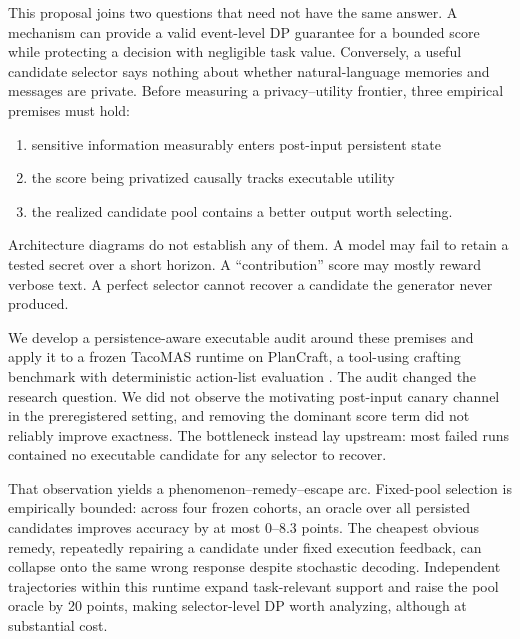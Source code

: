 \documentclass{article}
\begin{document}
This proposal joins two questions that need not have the same answer. A mechanism can provide a valid event-level DP guarantee for a bounded score while protecting a decision with negligible task value. Conversely, a useful candidate selector says nothing about whether natural-language memories and messages are private. Before measuring a privacy--utility frontier, three empirical premises must hold:
\begin{enumerate}
    \item sensitive information measurably enters post-input persistent state
    \item the score being privatized causally tracks executable utility
    \item the realized candidate pool contains a better output worth selecting.
\end{enumerate}
Architecture diagrams do not establish any of them. A model may fail to retain a tested secret over a short horizon. A ``contribution'' score may mostly reward verbose text. A perfect selector cannot recover a candidate the generator never produced.

We develop a persistence-aware executable audit around these premises and apply it to a frozen TacoMAS runtime on PlanCraft, a tool-using crafting benchmark with deterministic action-list evaluation \citep{dagan2025plancraft}. The audit changed the research question. We did not observe the motivating post-input canary channel in the preregistered setting, and removing the dominant score term did not reliably improve exactness. The bottleneck instead lay upstream: most failed runs contained no executable candidate for any selector to recover.

 That observation yields a phenomenon--remedy--escape arc. Fixed-pool selection is empirically bounded: across four frozen cohorts, an oracle over all persisted candidates improves accuracy by at most 0--8.3 points. The cheapest obvious remedy, repeatedly repairing a candidate under fixed execution feedback, can collapse onto the same wrong response despite stochastic decoding. Independent trajectories within this runtime expand task-relevant support and raise the pool oracle by 20 points, making selector-level DP worth analyzing, although at substantial cost.
\end{document}
